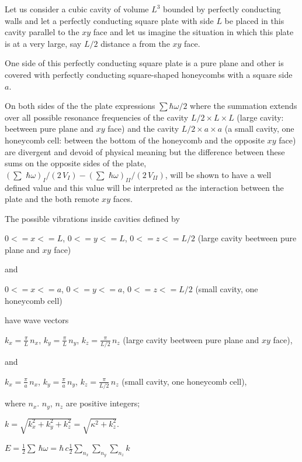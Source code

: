 \documentclass[11pt]{article}
\begin{document}
    Let us consider a cubic cavity of volume \(L^3\) bounded by perfectly
conducting walls and let a perfectly conducting square plate with side
\(L\) be placed in this cavity parallel to the \(xy\) face and let us
imagine the situation in which this plate is at a very large, say
\(L/2\) distance a from the \(xy\) face.

One side of this perfectly conducting square plate is a pure plane and
other is covered with perfectly conducting square-shaped honeycombs with
a square side \(a\).

On both sides of the the plate expressions \(\sum\hbar\omega\big/2\)
where the summation extends over all possible resonance frequencies of
the cavity \(L/2 \times L \times L\) (large cavity: beetween pure plane
and \(xy\) face) and the cavity \(L/2 \times a\times a\) (a small
cavity, one honeycomb cell: between the bottom of the honeycomb and the
opposite \(xy\) face) are divergent and devoid of physical meaning but
the difference between these sums on the opposite sides of the plate,
\(\left(\sum\,\,\hbar\omega\right)_{I}\big/{\left(2\,V_{I}\right)} - \left(\sum\,\,\hbar\omega\right)_{II}\big/{\left(2\,V_{II}\right)}\),
will be shown to have a well defined value and this value will be
interpreted as the interaction between the plate and the both remote
\(xy\) faces.

    The possible vibrations inside cavities defined by

    \(0<=x<=L\), \(0<=y<=L\), \(0<=z<=L/2\) (large cavity beetween pure
plane and \(xy\) face)

    and

    \(0<=x<=a\), \(0<=y<=a\), \(0<=z<=L/2\) (small cavity, one honeycomb
cell)

    have wave vectors

    \(k_x = \frac{\pi}{L}\,n_x\), \(k_y = \frac{\pi}{L}\,n_y\),
\(k_z = \frac{\pi}{L/2}\,n_z\) (large cavity beetween pure plane and
\(xy\) face),

    and

    \(k_x = \frac{\pi}{a}\,n_x\), \(k_y = \frac{\pi}{a}\,n_y\),
\(k_z = \frac{\pi}{L/2}\,n_z\) (small cavity, one honeycomb cell),

where \(n_x\). \(n_y\), \(n_z\) are positive integers;

    \(k = \sqrt{k_x^2+k_y^2+k_z^2} = \sqrt{\kappa^2+k_z^2}\).

    \(E = \frac{1}{2}\sum\,\hbar\omega = \hbar\,c\frac{1}{2}\sum\limits_{n_x}^{}\sum\limits_{n_y}^{}\sum\limits_{n_z}^{}k\)
\end{document}
